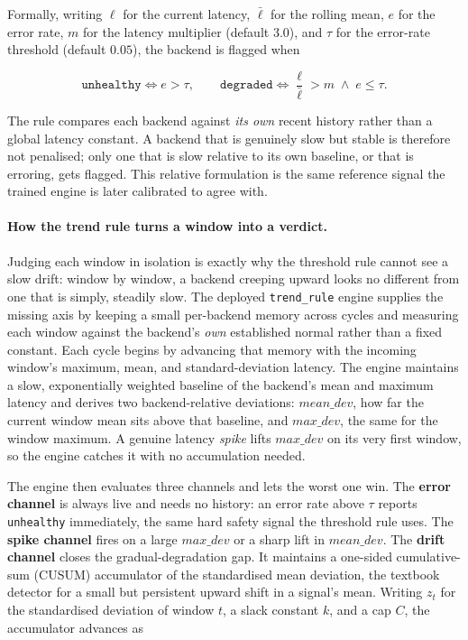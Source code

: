 Formally, writing $\ell$ for the current latency, $\bar{\ell}$ for the rolling
mean, $e$ for the error rate, $m$ for the latency multiplier (default $3.0$),
and $\tau$ for the error-rate threshold (default $0.05$), the backend is flagged
when

\begin{equation}\label{imb:eq:threshold}
  \texttt{unhealthy} \iff e > \tau,
  \qquad
  \texttt{degraded} \iff \frac{\ell}{\bar{\ell}} > m \;\wedge\; e \le \tau .
\end{equation}

The rule compares each backend against \emph{its own} recent history rather than
a global latency constant. A backend that is genuinely slow but stable is
therefore not penalised; only one that is slow relative to its own baseline, or
that is erroring, gets flagged. This relative formulation is the same reference
signal the trained engine is later calibrated to agree with.

\paragraph{How the trend rule turns a window into a verdict.} Judging each window
in isolation is exactly why the threshold rule cannot see a slow drift: window by
window, a backend creeping upward looks no different from one that is simply,
steadily slow. The deployed \texttt{trend\_rule} engine supplies the missing axis
by keeping a small per-backend memory across cycles and measuring each window
against the backend's \emph{own} established normal rather than a fixed constant.
Each cycle begins by advancing that memory with the incoming window's maximum,
mean, and standard-deviation latency. The engine maintains a slow, exponentially
weighted baseline of the backend's mean and maximum latency and derives two
backend-relative deviations: \(\mathit{mean\_dev}\), how far the current window
mean sits above that baseline, and \(\mathit{max\_dev}\), the same for the window
maximum. A genuine latency \emph{spike} lifts \(\mathit{max\_dev}\) on its very
first window, so the engine catches it with no accumulation needed.

The engine then evaluates three channels and lets the worst one win. The
\textbf{error channel} is always live and needs no history: an error rate above
\(\tau\) reports \texttt{unhealthy} immediately, the same hard safety signal the
threshold rule uses. The \textbf{spike channel} fires on a large
\(\mathit{max\_dev}\) or a sharp lift in \(\mathit{mean\_dev}\). The
\textbf{drift channel} closes the gradual-degradation gap. It maintains a
one-sided cumulative-sum (CUSUM) accumulator of the standardised mean deviation,
the textbook detector for a small but persistent upward shift in a signal's mean.
Writing \(z_t\) for the standardised deviation of window \(t\), a slack constant
\(k\), and a cap \(C\), the accumulator advances as

